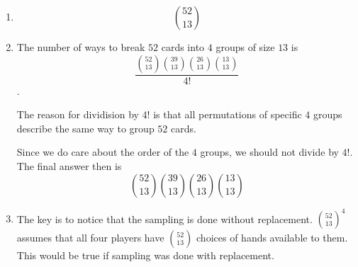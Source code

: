 \begin{enumerate}[label=(\alph*)]
\item $${52 \choose 13}$$

\item The number of ways to break $52$ cards into $4$ groups of size $13$ is $$\frac{{52 \choose 13}{39 \choose 13}{26 \choose 13}{13 \choose 13}}{4!}$$.
  
  The reason for dividision by $4!$ is that all permutations of specific $4$ groups describe the same way to group $52$ cards.
  
  Since we do care about the order of the $4$ groups, we should not divide by ${4!}$. The final answer then is 
  $${52 \choose 13}{39 \choose 13}{26 \choose 13}{13 \choose 13}$$

\item The key is to notice that the sampling is done without replacement. ${52 \choose 13}^{4}$ assumes that all four players have ${52 \choose 13}$ choices of hands available to them. This would be true if sampling was done with replacement.
\end{enumerate}